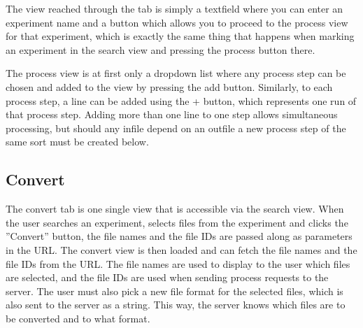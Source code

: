 The view reached through the tab is simply a textfield where you can enter an
experiment name and a button which allows you to proceed to the process view
for that experiment, which is exactly the same thing that happens when marking
an experiment in the search view and pressing the process button there.

The process view is at first only a dropdown list where any process step can
be chosen and added to the view by pressing the add button. Similarly, to each 
process step, a line can be added using the + button, which represents one run
of that process step. Adding more than one line to one step allows simultaneous
processing, but should any infile depend on an outfile a new process step of the
same sort must be created below.

\subsection{Convert}

The convert tab is one single view that is accessible via the search view. When the user searches an experiment, selects files from the experiment and clicks the ''Convert'' button, the file names and the file IDs are passed along as parameters in the URL. The convert view is then loaded and can fetch the file names and the file IDs from the URL. The file names are used to display to the user which files are selected, and the file IDs are used when sending process requests to the server. The user must also pick a new file format for the selected files, which is also sent to the server as a string. This way, the server knows which files are to be converted and to what format.



